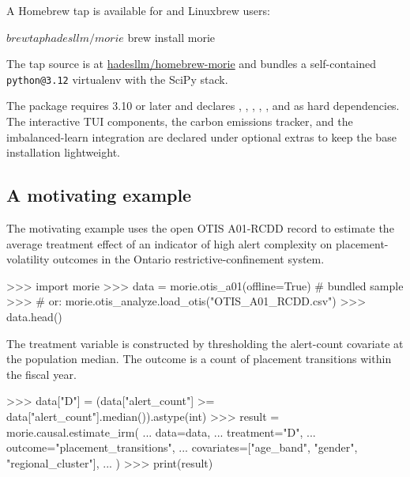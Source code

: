 \documentclass[article,shortnames,nojss]{jss}
\newcommand{\OTIS}{\textsf{OTIS}}
\begin{document}

\noindent A Homebrew tap is available for  and
Linuxbrew users:

\begin{Code}
$ brew tap hadesllm/morie
$ brew install morie
\end{Code}

\noindent The tap source is at
\href{https://github.com/hadesllm/homebrew-morie}{hadesllm/homebrew-morie}
and bundles a self-contained \texttt{python@3.12} virtualenv with the
SciPy stack.

\noindent The package requires  3.10 or later
and declares , , ,
, , and  as
hard dependencies. The interactive TUI components, the carbon
emissions tracker, and the imbalanced-learn integration are
declared under optional extras to keep the base installation
lightweight.

\subsection{A motivating example}

The motivating example uses the open \OTIS{} A01-RCDD record to
estimate the average treatment effect of an indicator of high
alert complexity on placement-volatility outcomes in the Ontario
restrictive-confinement system.

\begin{Code}
>>> import morie
>>> data = morie.otis_a01(offline=True)        # bundled sample
>>> # or: morie.otis_analyze.load_otis("OTIS_A01_RCDD.csv")
>>> data.head()
\end{Code}

\noindent The treatment variable is constructed by thresholding
the alert-count covariate at the population median. The outcome is
a count of placement transitions within the fiscal year.

\begin{Code}
>>> data["D"] = (data["alert_count"] >= data["alert_count"].median()).astype(int)
>>> result = morie.causal.estimate_irm(
...     data=data,
...     treatment="D",
...     outcome="placement_transitions",
...     covariates=["age_band", "gender", "regional_cluster"],
... )
>>> print(result)
\end{Code}
\end{document}
